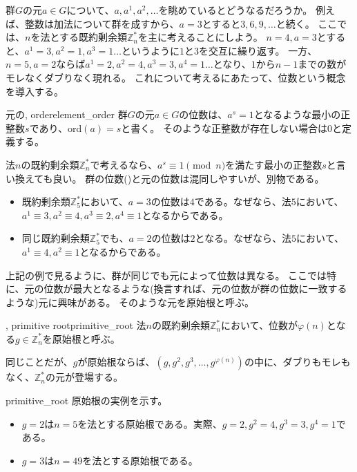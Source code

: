 群$G$の元$a\in G$について、$a, a^1, a^2,\ldots$を眺めているとどうなるだろうか。
例えば、整数は加法について群を成すから、$a=3$とすると$3,6,9,\ldots$と続く。
ここでは、$n$を法とする既約剰余類$\mathbb{Z}_n^*$を主に考えることにしよう。
$n=4,a=3$とすると、$a^1=3,a^2=1,a^3=1\ldots$というように$1$と$3$を交互に繰り返す。
一方、$n=5,a=2$ならば$a^1=2,a^2=4,a^3=3,a^4=1\ldots$となり、$1$から$n-1$までの数がモレなくダブりなく現れる。
これについて考えるにあたって、位数という概念を導入する。

\begin{Defi}{元の, order}{element_order}
群$G$の元$a\in G$の位数は、$a^s = 1$となるような最小の正整数$s$であり、$\mbox{ord}(a)=s$と書く。
そのような正整数が存在しない場合は$0$と定義する。
\end{Defi}

法$n$の既約剰余類$\mathbb{Z}_n^*$で考えるなら、$a^s \equiv 1 \pmod{n}$を満たす最小の正整数$s$と言い換えても良い。
群の位数()と元の位数は混同しやすいが、別物である。

\begin{itemize}
 \item 既約剰余類$\mathbb{Z}_{5}^*$において、$a=3$の位数は$4$である。なぜなら、法$5$において、$a^1\equiv3,a^2\equiv4,a^3\equiv2,a^4\equiv1$となるからである。
 \item 同じ既約剰余類$\mathbb{Z}_{5}^*$でも、$a=2$の位数は$2$となる。なぜなら、法$5$において、$a^1\equiv4,a^2\equiv1$となるからである。
\end{itemize}

上記の例で見るように、群が同じでも元によって位数は異なる。
ここでは特に、元の位数が最大となるような(換言すれば、元の位数が群の位数に一致するような)元に興味がある。
そのような元を原始根と呼ぶ。

\begin{Defi}{, primitive root}{primitive_root}
法$n$の既約剰余類$\mathbb{Z}_n^*$において、位数が$\varphi(n)$となる$g\in\mathbb{Z}_n^*$を原始根と呼ぶ。
\end{Defi}

同じことだが、$g$が原始根ならば、$(g,g^2,g^3,\ldots,g^{\varphi(n)})$の中に、ダブりもモレもなく、$\mathbb{Z}_n^*$の元が登場する。
\begin{Exam}{}{primitive_root}
原始根の実例を示す。
\begin{itemize}
 \item $g=2$は$n=5$を法とする原始根である。実際、$g=2,g^2=4,g^3=3,g^4=1$である。
 \item $g=3$は$n=49$を法とする原始根である。
\end{itemize}
\end{Exam}

